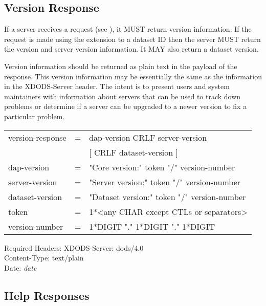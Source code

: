 \documentclass[justify]{dods-paper}
\begin{document}
\subsection{Version Response}
\label{sec-version-response}

If a \DAP server receives a  request (see
), it MUST return \DAP version
information. If the request is made using the  extension to a
dataset ID then the server MUST return the \DAP version and server
version information. It MAY also return a dataset version.

Version information should be returned as plain text in the payload of the
response. This version information may be essentially the same as the
information in the XDODS-Server header. The intent is to present users and
system maintainers with information about servers that can be used to track
down problems or determine if a server can be upgraded to a newer version to
fix a particular problem.

\begin{ttfamily}
\begin{center}
\begin{tabular}{lll}
version-response & = & dap-version CRLF server-version \\
                 & & [ CRLF dataset-version ] \\
dap-version & = & "Core version:" token "/" version-number \\
server-version & = & "Server version:" token "/" version-number \\
dataset-version & = & "Dataset version:" token "/" version-number \\
token & = & 1*<any CHAR except CTLs or separators> \\
version-number & = & 1*DIGIT "." 1*DIGIT "." 1*DIGIT \\
\end{tabular}
\end{center}
\end{ttfamily}

\begin{textoutput}{Required Headers:}
XDODS-Server: dods/4.0\\
Content-Type: text/plain\\
Date: \emph{date}
\end{textoutput}


\subsection{Help Responses}
\label{sec-help-response}
\end{document}
